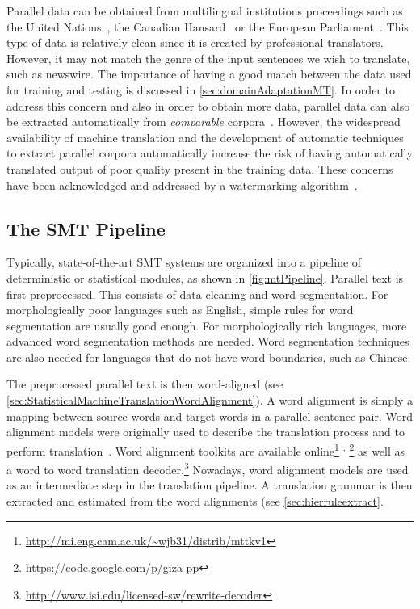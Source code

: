 Parallel data can be obtained from multilingual institutions
proceedings such as the United
Nations~\citep{franz-kumar-brants:2013:LDC},%
the Canadian
Hansard~\citep{germann:2001:WEB} or the
European Parliament~\citep{koehn:2005:MTSummit}.
This type of data is relatively clean since it is created
by professional translators. However, it may not match
the genre of the input sentences we wish to translate, such
as newswire. The importance of having a good match between
the data used for training and testing is discussed
in \autoref{sec:domainAdaptationMT}. In order to address
this concern and also in order to obtain more data, parallel
data can also be extracted automatically from \emph{comparable}
corpora~\citep{smith-saintamand-plamada-koehn-callisonburch-lopez:2013:ACL2013}.
However, the widespread availability of
machine translation and the development of automatic techniques
to extract parallel corpora automatically increase the
risk of having automatically translated output of poor
quality present in the training data. These concerns have
been acknowledged and addressed by a watermarking
algorithm~\citep{venugopal-uszkoreit-talbot-och-ganitkevitch:2011:EMNLP}.

\subsection{The SMT Pipeline}

Typically, state-of-the-art SMT systems are organized into
a pipeline of deterministic or statistical modules, as shown
in \autoref{fig:mtPipeline}.
Parallel text is first preprocessed. This consists of data cleaning
and word segmentation. For morphologically poor languages such as
English, simple rules for word segmentation are usually good enough.
For morphologically rich languages, more advanced word segmentation
methods are needed. Word segmentation techniques are also needed
for languages that do not have word boundaries, such as Chinese.

The preprocessed parallel text is then word-aligned
(see \autoref{sec:StatisticalMachineTranslationWordAlignment}).
A word alignment is simply a mapping between source words and
target words in a parallel sentence pair. Word alignment models
were originally used to describe the translation process and
to perform
translation~\citep{germann-jahr-knight-marcu-yamada:2001:ACL}.
Word alignment toolkits are available
online\footnote{\url{http://mi.eng.cam.ac.uk/~wjb31/distrib/mttkv1}}%
      \textsuperscript{,}%
      \footnote{\url{https://code.google.com/p/giza-pp}}
as well as a word to word translation
decoder.\footnote{\url{http://www.isi.edu/licensed-sw/rewrite-decoder}}
Nowadays, word alignment models are used as an intermediate
step in the translation pipeline.
A translation grammar is then extracted and estimated
from the word alignments (see \autoref{sec:hierruleextract}.

